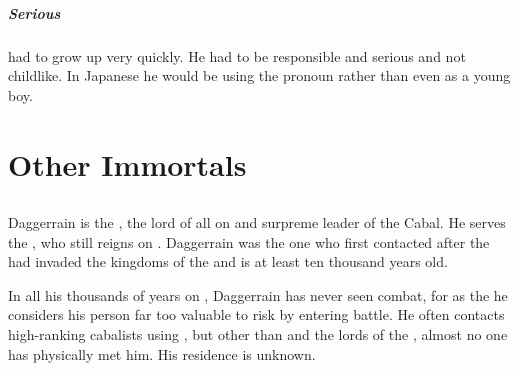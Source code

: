 \subsubsection{Serious}
\Thanatzil had to grow up very quickly. 
He had to be responsible and serious and not childlike.
In Japanese he would be using the pronoun \emph{} rather than \emph{} even as a young boy. 































\part{Other Immortals}























\chapter{\Banes}
\section{\Daggerrain}
Daggerrain is the \baneoverlord, the lord of all \banes{} on \Miith{} and surpreme leader of the Cabal. He serves the \baneking{} \Voidbringer, who still reigns on \Erebos. Daggerrain was the one who first contacted \Semiza{} after the \dragons{} had invaded the kingdoms of the \nephilim{} and is at least ten thousand years old. 

In all his thousands of years on \Miith{}, Daggerrain has never seen combat, for as the \baneoverlord{} he considers his person far too valuable to risk by entering battle. He often contacts high-ranking cabalists using , but other than \banelords{} and the lords of the \resphain, almost no one has physically met him. His residence is unknown.

